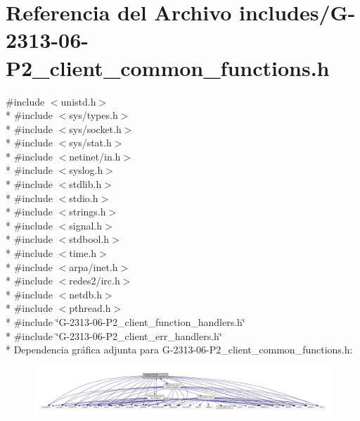 \hypertarget{G-2313-06-P2__client__common__functions_8h}{}\section{Referencia del Archivo includes/\+G-\/2313-\/06-\/\+P2\+\_\+client\+\_\+common\+\_\+functions.h}
\label{G-2313-06-P2__client__common__functions_8h}
{\ttfamily \#include $<$unistd.\+h$>$}\\*
{\ttfamily \#include $<$sys/types.\+h$>$}\\*
{\ttfamily \#include $<$sys/socket.\+h$>$}\\*
{\ttfamily \#include $<$sys/stat.\+h$>$}\\*
{\ttfamily \#include $<$netinet/in.\+h$>$}\\*
{\ttfamily \#include $<$syslog.\+h$>$}\\*
{\ttfamily \#include $<$stdlib.\+h$>$}\\*
{\ttfamily \#include $<$stdio.\+h$>$}\\*
{\ttfamily \#include $<$strings.\+h$>$}\\*
{\ttfamily \#include $<$signal.\+h$>$}\\*
{\ttfamily \#include $<$stdbool.\+h$>$}\\*
{\ttfamily \#include $<$time.\+h$>$}\\*
{\ttfamily \#include $<$arpa/inet.\+h$>$}\\*
{\ttfamily \#include $<$redes2/irc.\+h$>$}\\*
{\ttfamily \#include $<$netdb.\+h$>$}\\*
{\ttfamily \#include $<$pthread.\+h$>$}\\*
{\ttfamily \#include \char`\"{}G-\/2313-\/06-\/\+P2\+\_\+client\+\_\+function\+\_\+handlers.\+h\char`\"{}}\\*
{\ttfamily \#include \char`\"{}G-\/2313-\/06-\/\+P2\+\_\+client\+\_\+err\+\_\+handlers.\+h\char`\"{}}\\*
Dependencia gráfica adjunta para G-\/2313-\/06-\/\+P2\+\_\+client\+\_\+common\+\_\+functions.h\+:\nopagebreak
\begin{figure}[H]
\begin{center}
\leavevmode
\includegraphics[width=350pt]{G-2313-06-P2__client__common__functions_8h__incl}
\end{center}
\end{figure}
